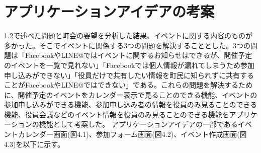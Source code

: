 \section{アプリケーションアイデアの考案}
1.2で述べた問題と町会の要望を分析した結果、イベントに関する内容のものが多かった。そこでイベントに関係する3つの問題を解決することとした。3つの問題は「FacebookやLINE@ではイベントに関するお知らせはできるが、開催予定のイベントを一覧で見れない」「Facebookでは個人情報が漏れてしまうため参加申し込みができない」「役員だけで共有したい情報を町民に知られずに共有することがFacebookやLINE@ではできない」である。これらの問題を解決するために、開催予定のイベントをカレンダー表示で見ることのできる機能、イベントの参加申し込みができる機能、参加申し込み者の情報を役員のみ見ることのできる機能、役員会議などのイベント情報を役員のみ見ることのできる機能をアプリケーションの機能として考案した。
アプリケーションアイデアの一部であるイベントカレンダー画面(図4.1)、参加フォーム画面(図4.2)、イベント作成画面(図4.3)を以下に示す。
\newpage
